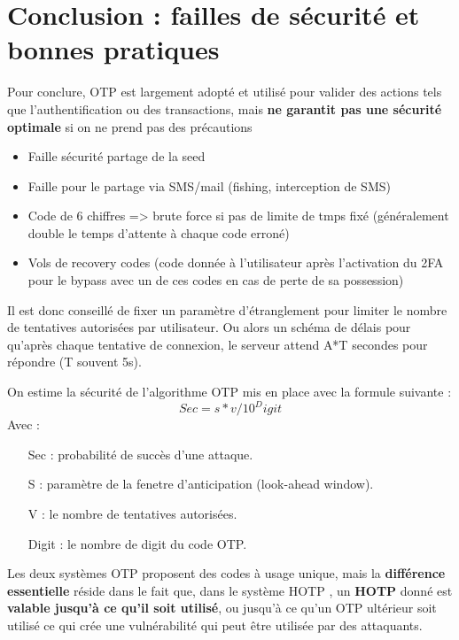 \documentclass[a4paper, 10pt]{article}
\newcommand{\otp}{\textsc{OTP} }
\newcommand{\hotp}{\textsc{HOTP} }
\begin{document}
\newpage
    \section{Conclusion : failles de sécurité et bonnes pratiques}

Pour conclure, \otp est largement adopté et \textcolor{myblue}{utilisé pour valider des actions} tels que l’authentification ou des transactions, mais \textbf{ne garantit pas une sécurité optimale} si on ne prend pas des précautions
\begin{itemize}
    \item	Faille sécurité partage de la seed
    \item	Faille pour le partage via SMS/mail (fishing, interception de SMS)
    \item	Code de 6 chiffres => brute force si pas de limite de tmps fixé (généralement double le temps d’attente à chaque code erroné)
    \item	Vols de recovery codes (code donnée à l'utilisateur après l'activation du 2FA pour le bypass avec un de ces codes en cas de perte de sa possession) 
\end{itemize}

Il est donc conseillé de fixer un \textcolor{mygreen}{paramètre d’étranglement} pour limiter le nombre de tentatives autorisées par utilisateur. Ou alors un \textcolor{mygreen}{schéma de délais} pour qu'après chaque tentative de connexion, le serveur attend \textcolor{mygreen}{A*T secondes} pour répondre (T souvent 5s).


On estime la sécurité de l'algorithme \otp mis en place avec la formule suivante :
\textcolor{myblue}{$$
Sec = s * v / 10^Digit
$$}
\noindent
Avec :
\begin{itemize}
    \item[Sec :] probabilité de succès d’une attaque.
    \item[S : ] paramètre de la fenetre d’anticipation (look-ahead window).
    \item[V : ] le nombre de tentatives autorisées.
    \item[Digit : ] le nombre de digit du code OTP.\\
\end{itemize}


Les deux systèmes \otp proposent des codes à usage unique, mais la \textbf{différence essentielle} réside dans le fait que, dans le système \hotp, un \textbf{\hotp} donné est \textbf{valable jusqu'à ce qu'il soit utilisé}, ou jusqu'à ce qu'un \otp ultérieur soit utilisé ce qui crée une vulnérabilité qui peut être utilisée par des attaquants. 
\end{document}
